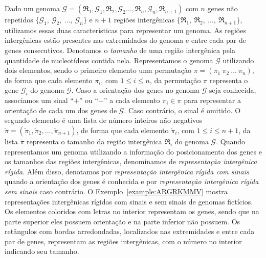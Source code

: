 Dado um genoma $\mathcal{G}=(\mathfrak{R}_1,\mathcal{G}_1,\mathfrak{R}_2,\mathcal{G}_2\dots,\mathfrak{R}_n,\mathcal{G}_n,\mathfrak{R}_{n+1})$ com $n$ genes não repetidos $\{\mathcal{G}_1,\:\mathcal{G}_2,\:\dots,\:\mathcal{G}_n\}$ e $n+1$ regiões intergênicas $\{\mathfrak{R}_1,\:\mathfrak{R}_2,\:\dots,\:\mathfrak{R}_{n+1}$\}, utilizamos essas duas características para representar um genoma. As regiões intergênicas estão presentes nas extremidades do genoma e entre cada par de genes consecutivos. Denotamos o \emph{tamanho} de uma região intergênica pela quantidade de nucleotídeos contida nela. Representamos o genoma $\mathcal{G}$ utilizando dois elementos, sendo o primeiro elemento uma permutação $\pi=(\pi_1~\pi_2~\dots~\pi_n)$, de forma que cada elemento $\pi_i$, com $1 \le i \le n$, da permutação $\pi$ representa o gene $\mathcal{G}_i$ do genoma $\mathcal{G}$. Caso a orientação dos genes no genoma $\mathcal{G}$ seja conhecida, associamos um sinal ``$+$'' ou ``$-$'' a cada elemento $\pi_i \in \pi$ para representar a orientação de cada um dos genes de $\mathcal{G}$. Caso contrário, o sinal é omitido. O segundo elemento é uma lista de número inteiros não negativos $\breve\pi=(\breve\pi_1,\breve\pi_2,\dots,\breve\pi_{n+1})$, de forma que cada elemento $\breve\pi_i$, com $1 \le i \le {n+1}$, da lista $\breve\pi$ representa o tamanho da região intergênica $\mathfrak{R}_i$ do genoma $\mathcal{G}$. Quando representamos um genoma utilizando a informação do posicionamento dos genes e os tamanhos das regiões intergênicas, denominamos de \emph{representação intergênica rígida}. Além disso, denotamos por \emph{representação intergênica rígida com sinais} quando a orientação dos genes é conhecida e por \emph{representação intergênica rígida sem sinais} caso contrário. O Exemplo~\ref{example:ARGRKMMV} mostra representações intergênicas rígidas com sinais e sem sinais de genomas fictícios. Os elementos coloridos com letras no interior representam os genes, sendo que na parte superior eles possuem orientação e na parte inferior não possuem. Os retângulos com bordas arredondadas, localizados nas extremidades e entre cada par de genes, representam as regiões intergênicas, com o número no interior indicando seu tamanho. 



